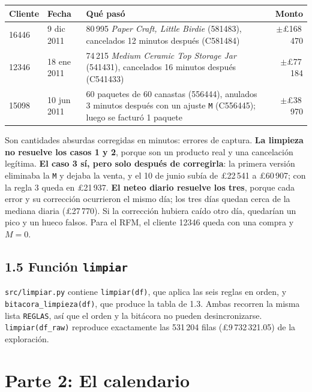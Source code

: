 \documentclass[11pt,letterpaper]{article}
\newcommand{\lib}{\pounds}
\begin{document}
\begin{table}[H]
\centering
\small
\begin{tabular}{llp{8.2cm}r}
\toprule
Cliente & Fecha & Qué pasó & Monto\\
\midrule
16446 & 9 dic 2011 & 80\,995 \emph{Paper Craft, Little Birdie} (581483), cancelados 12 minutos después (C581484) & $\pm$\lib168\,470\\
12346 & 18 ene 2011 & 74\,215 \emph{Medium Ceramic Top Storage Jar} (541431), cancelados 16 minutos después (C541433) & $\pm$\lib77\,184\\
15098 & 10 jun 2011 & 60 paquetes de 60 canastas (556444), anulados 3 minutos después con un ajuste \texttt{M} (C556445); luego se facturó 1 paquete & $\pm$\lib38\,970\\
\bottomrule
\end{tabular}
\end{table}

Son cantidades absurdas corregidas en minutos: errores de captura. \textbf{La limpieza no resuelve los casos 1 y 2}, porque son un producto real y una cancelación legítima. \textbf{El caso 3 sí, pero solo después de corregirla}: la primera versión eliminaba la \texttt{M} y dejaba la venta, y el 10 de junio subía de \lib22\,541 a \lib60\,907; con la regla 3 queda en \lib21\,937. \textbf{El neteo diario resuelve los tres}, porque cada error y su corrección ocurrieron el mismo día; los tres días quedan cerca de la mediana diaria (\lib27\,770). Si la corrección hubiera caído otro día, quedarían un pico y un hueco falsos. Para el RFM, el cliente 12346 queda con una compra y $M=0$.

\subsection*{1.5 Función \texttt{limpiar}}

\texttt{src/limpiar.py} contiene \texttt{limpiar(df)}, que aplica las seis reglas en orden, y \texttt{bitacora\_limpieza(df)}, que produce la tabla de 1.3. Ambas recorren la misma lista \texttt{REGLAS}, así que el orden y la bitácora no pueden desincronizarse. \texttt{limpiar(df\_raw)} reproduce exactamente las 531\,204 filas (\lib9\,732\,321.05) de la exploración.

\section*{Parte 2: El calendario}
\end{document}
